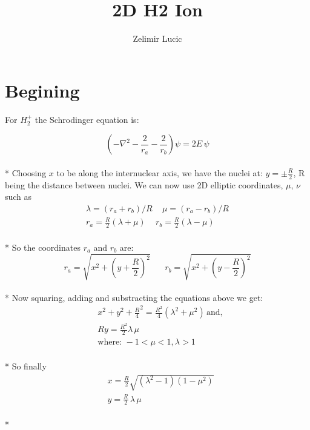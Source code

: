 \documentclass[11pt, oneside]{article}   	%
\title{2D H2 Ion}
\author{Zelimir Lucic}
\date{}							%
\begin{document}
\maketitle
\section{Begining}

For $ H_2^+ $ the Schrodinger equation is:

\begin{equation}\label{start}
\left(-\nabla^2-\frac{2}{r_a}-\frac{2}{r_b}\right)\psi = 2E\,\psi
\end{equation} \\*
Choosing $ x $ to be along the internuclear axis, we have the nuclei at: $ y = \pm \frac{R}{2}  $, R being the distance between nuclei. We can now use 2D elliptic coordinates, $ \mu $, $ \nu $ such as 
\begin{equation}\label{variables}
\begin{split}
\lambda = \left(r_a + r_b\right)/R\,\,\,\,\,\,\,\mu =  \left(r_a - r_b\right)/R  \\
r_a = \frac{R}{2}\left(\lambda + \mu \right)\,\,\,\,\,\,\, r_b = \frac{R}{2}\left(\lambda - \mu \right)
\end{split}
\end{equation}\\*
So the coordinates $ r_a $ and $ r_b $ are:
\begin{equation}
r_a  = \sqrt{x^2 + \left(y + \frac{R}{2}\right)^2 }\,\,\,\,\,\,\,\,\,\,r_b  = \sqrt{x^2 + \left(y - \frac{R}{2}\right)^2 }
\end{equation}\\*
Now squaring, adding and substracting the equations above we get:
\begin{equation}
\begin{split}
& x^2 + y ^2 + \frac{R}{4}^2 = \frac{R^2}{4}\left(\lambda^2 + \mu^2\right) \,\text{and},\\
& Ry = \frac{R^2}{2} \lambda\, \mu \\[.8em]
& \text{where:   } -1 < \mu < 1, \lambda > 1
\end{split}
\end{equation}\\*
So finally
\begin{equation}
\begin{split}
& x = \frac{R}{2}\sqrt{\left(\lambda^2 - 1\right)\left(1 - \mu ^2 \right) } \\
& y = \frac{R}{2}\,\lambda\,\mu
\end{split}
\end{equation}\\*
\end{document}
